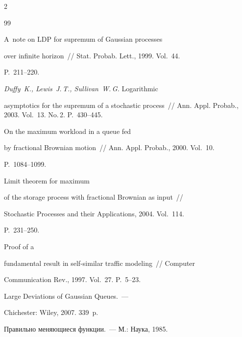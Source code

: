 \begin{multicols}{2}
{{\begin{thebibliography}{99}


 A~note on LDP for supremum of Gaussian processes


over infinite horizon~// Stat. Probab. Lett., 1999. Vol.~44.


P.~211--220.







\textit{Duffy~K., Lewis~J.\,T., Sullivan~W.\,G.} Logarithmic


asymptotics for the supremum of a stochastic process~// Ann. Appl. Probab., 2003. Vol.~13. No.\,2. P.~430--445.







 On the maximum workload in a queue fed


by fractional Brownian motion~// Ann. Appl. Probab., 2000. Vol.~10.


P.~1084--1099.







 Limit theorem for maximum


of the storage process with fractional Brownian as input~// 


Stochastic Processes and their Applications, 2004. Vol.~114.


P.~231--250.







 Proof of a


fundamental result in self-similar traffic modeling~// Computer


Communication Rev., 1997. Vol.~27. P.~5--23.







 Large Deviations of Gaussian Queues.~---


Chichester: Wiley, 2007. 339~p.







 Правильно меняющиеся функции.~--- М.: Наука, 1985.



\end{thebibliography}}}
\end{multicols}
